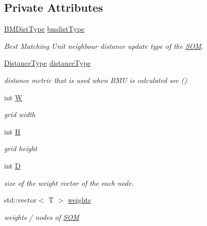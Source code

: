 \subsection*{Private Attributes}
\begin{DoxyCompactItemize}
\item 
\mbox{\hyperlink{_s_o_m_8h_a55f65662fc7b41a21c646e37b51ae9d9}{B\+M\+Dist\+Type}} \mbox{\hyperlink{class_s_o_m_a8d02f1179ca154170fd3bf349a112706}{bmdist\+Type}}
\begin{DoxyCompactList}\small\item\em Best Matching Unit neighbour distance update type of the \mbox{\hyperlink{class_s_o_m}{S\+OM}}. \end{DoxyCompactList}\item 
\mbox{\hyperlink{_s_o_m_8h_a69503914f8053c00b814b3096e784d72}{Distance\+Type}} \mbox{\hyperlink{class_s_o_m_a2cdff72776415d723fba0e90b7df5bc8}{distance\+Type}}
\begin{DoxyCompactList}\small\item\em distance metric that is used when B\+MU is calculated see () \end{DoxyCompactList}\item 
int \mbox{\hyperlink{class_s_o_m_a99414c651f0e1371d0e16437a1769fd9}{W}}
\begin{DoxyCompactList}\small\item\em grid width \end{DoxyCompactList}\item 
int \mbox{\hyperlink{class_s_o_m_a34ef6069c3f522ece1b0dad99484a9c3}{H}}
\begin{DoxyCompactList}\small\item\em grid height \end{DoxyCompactList}\item 
int \mbox{\hyperlink{class_s_o_m_a125c2393ee9e0f75a42bd03db31a2f15}{D}}
\begin{DoxyCompactList}\small\item\em size of the weight vector of the each node. \end{DoxyCompactList}\item 
std\+::vector$<$ T $>$ \mbox{\hyperlink{class_s_o_m_abb0a6072eb9fd4c3bd297814e654f561}{weights}}
\begin{DoxyCompactList}\small\item\em weights / nodes of \mbox{\hyperlink{class_s_o_m}{S\+OM}} \end{DoxyCompactList}\end{DoxyCompactItemize}
